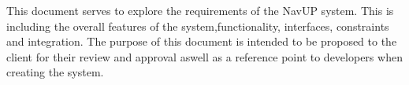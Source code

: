 This document serves to explore the requirements of the NavUP system. This is including the overall features of the system,functionality, interfaces, constraints and integration. The purpose of this document is intended to be proposed to the client for their review and approval aswell as a reference point to developers when creating the system.
